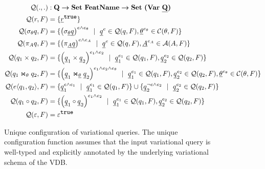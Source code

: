 \begin{figure}[ht!]
\begin{alignat*}{1}
\qGroup [.] . &: \qSet \totype  \settype \fSet \totype \settype {\bm{(} \vartype \pQSet \bm{)}}\\
%
\qGroup \vRel &= \setDef {\annot [\t] \pRel}\\
\qGroup {\vSel \vQ}  &=  
\setDef {\annot [\dimMeta \wedge \dimMeta_\vCond] {\left(\sigma_{\pCond} \pQ\right)} \myOR
\annot \pQ \in \qGroup \vQ, \annot [\dimMeta_\vCond] \pCond \in \cGroup}
\\
%
\qGroup {\vPrj [\vAttList] \vQ} &= 
\setDef {\annot [\dimMeta \wedge \dimMeta_\vAttList] {\left(\pi_{\pAttList} \pQ \right)} \myOR
\annot \pQ \in \qGroup \vQ, \annot [\dimMeta_\vAttList] \pAttList \in \aGroup}
\\
%
\qGroup {{\vQ_1} \times {\vQ_2}} &= 
\setDef {\annot [\dimMeta_1 \wedge \dimMeta_2] {\left(\pQ_1 \times \pQ_2\right)} \myOR
\annot [\dimMeta_1] \pQ_1 \in \qGroup {\vQ_1}, \annot [\dimMeta_2] \pQ_2 \in \qGroup {\vQ_2} }
\\
%
\qGroup {{\vQ_1} \Join_\vCond {\vQ_2}} &= 
\setDef {\annot [\dimMeta_1 \wedge \dimMeta_2 \wedge \dimMeta_\vCond] {\left(\pQ_1 \Join_{\pCond} \pQ_2 \right)} \myOR 
\annot [\dimMeta_1] \pQ_1 \in \qGroup {\vQ_1}, \annot [\dimMeta_2] \pQ_2 \in \qGroup {\vQ_2}
,\annot [\dimMeta_\vCond] \pCond \in \cGroup  }
\\
%
\qGroup {\chc {\vQ_1, \vQ_2}} &= 
\setDef {\annot [\dimMeta \wedge \dimMeta_1] \pQ_1 \myOR  \annot [\dimMeta_1] \pQ_1 \in \qGroup {\vQ_1} }
\cup 
\setDef {\annot [\neg \dimMeta \wedge \dimMeta_2] \pQ_2 \myOR  \annot [\dimMeta_2] \pQ_2 \in \qGroup {\vQ_2}}  \\
%
\qGroup {{\vQ_1} \circ {\vQ_2}} &= 
\setDef {\annot [\dimMeta_1 \wedge \dimMeta_2] {\left(\pQ_1 \circ \pQ_2\right)} \myOR
\annot [\dimMeta_1] \pQ_1 \in \qGroup {\vQ_1}, \annot [\dimMeta_2] \pQ_2 \in \qGroup {\vQ_2} }\\
%
\qGroup {\empRel} &= \annot [\t] { \empRel}
\end{alignat*}
\caption[Unique configuration of variational queries]{Unique configuration of variational queries. 
The unique configuration function assumes that the input variational query is well-typed and explicitly annotated by the underlying variational schema of the VDB.
}
\label{fig:vq-group}
\end{figure}

